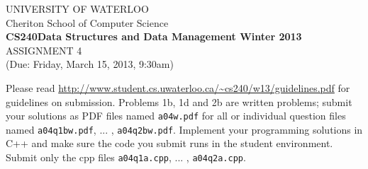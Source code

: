 \documentclass[11pt]{article}
\begin{document}
%
%
\begin{center}
UNIVERSITY OF WATERLOO\\
Cheriton School of Computer Science\\[\baselineskip]
{\bf CS240\hfill Data Structures and Data Management \hfill
Winter 2013}\\[\baselineskip]
{\sc \large ASSIGNMENT 4}\\
(Due: Friday, March 15, 2013, 9:30am)\\[2\baselineskip]
\end{center}
%
%

\noindent
Please read \url{http://www.student.cs.uwaterloo.ca/~cs240/w13/guidelines.pdf} for guidelines on submission. 
Problems 1b, 1d and 2b are written problems; submit your solutions as PDF files named {\tt a04w.pdf} for all or individual question files named {\tt a04q1bw.pdf}, ... , {\tt a04q2bw.pdf}. 
Implement your programming solutions in C++ and make sure the code you submit runs in the student environment.
Submit only the cpp files {\tt a04q1a.cpp}, ... , {\tt a04q2a.cpp}.
\noindent
\end{document}
